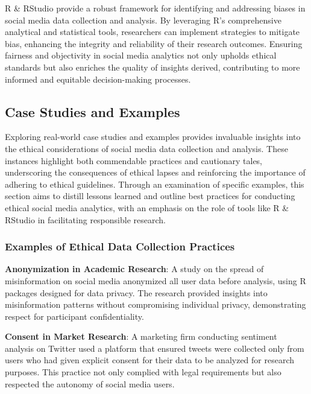 \documentclass[
]{book}
\begin{document}
R \& RStudio provide a robust framework for identifying and addressing biases in social media data collection and analysis. By leveraging R's comprehensive analytical and statistical tools, researchers can implement strategies to mitigate bias, enhancing the integrity and reliability of their research outcomes. Ensuring fairness and objectivity in social media analytics not only upholds ethical standards but also enriches the quality of insights derived, contributing to more informed and equitable decision-making processes.

\hypertarget{case-studies-and-examples}{%
\subsection*{Case Studies and Examples}\label{case-studies-and-examples}}

Exploring real-world case studies and examples provides invaluable insights into the ethical considerations of social media data collection and analysis. These instances highlight both commendable practices and cautionary tales, underscoring the consequences of ethical lapses and reinforcing the importance of adhering to ethical guidelines. Through an examination of specific examples, this section aims to distill lessons learned and outline best practices for conducting ethical social media analytics, with an emphasis on the role of tools like R \& RStudio in facilitating responsible research.

\hypertarget{examples-of-ethical-data-collection-practices}{%
\subsubsection*{Examples of Ethical Data Collection Practices}\label{examples-of-ethical-data-collection-practices}}

\textbf{Anonymization in Academic Research}: A study on the spread of misinformation on social media anonymized all user data before analysis, using R packages designed for data privacy. The research provided insights into misinformation patterns without compromising individual privacy, demonstrating respect for participant confidentiality.

\textbf{Consent in Market Research}: A marketing firm conducting sentiment analysis on Twitter used a platform that ensured tweets were collected only from users who had given explicit consent for their data to be analyzed for research purposes. This practice not only complied with legal requirements but also respected the autonomy of social media users.
\end{document}

